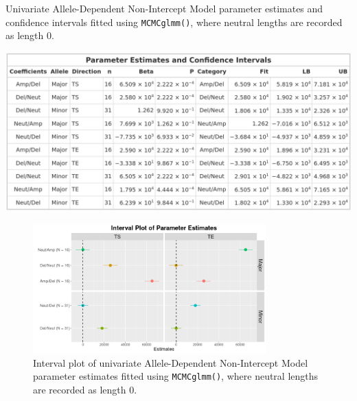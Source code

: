 \begin{table}[!htb]
\centering
\caption[Univariate Allele-Dependent Non-Intercept Model parameter estimates and confidence intervals, fitted using \texttt{MCMCglmm()}.]{Univariate Allele-Dependent Non-Intercept Model parameter estimates and confidence intervals fitted using \texttt{MCMCglmm()}, where neutral lengths are recorded as length 0.}
      
\includegraphics[width = 1\textwidth]{../tables/Chapter_5/Univariate_MCMC_6_AD_Model_Pred.png}
\end{table}

\begin{figure}[!htb]
\vspace{0.5cm}
     
\centering
\includegraphics[width = 0.8\textwidth]{../figures/Chapter_5/Univariate_MCMC_6_AD_Interval.png}
 
\caption[Interval plot of univariate Allele-Dependent Non-Intercept Model parameter estimates fitted using \texttt{MCMCglmm()}.]{Interval plot of univariate Allele-Dependent Non-Intercept Model parameter estimates fitted using \texttt{MCMCglmm()}, where neutral lengths are recorded as length 0.}
\end{figure}

